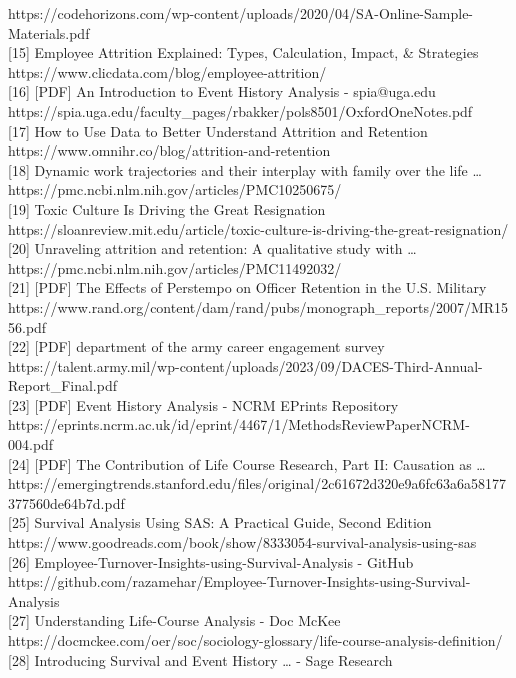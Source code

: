 \documentclass[./main.tex]{subfiles}
\begin{document}
https://codehorizons.com/wp-content/uploads/2020/04/SA-Online-Sample-Materials.pdf\\
{[}15{]} Employee Attrition Explained: Types, Calculation, Impact, \&
Strategies https://www.clicdata.com/blog/employee-attrition/\\
{[}16{]} {[}PDF{]} An Introduction to Event History Analysis -
spia@uga.edu
https://spia.uga.edu/faculty\_pages/rbakker/pols8501/OxfordOneNotes.pdf\\
{[}17{]} How to Use Data to Better Understand Attrition and Retention
https://www.omnihr.co/blog/attrition-and-retention\\
{[}18{]} Dynamic work trajectories and their interplay with family over
the life \ldots{} https://pmc.ncbi.nlm.nih.gov/articles/PMC10250675/\\
{[}19{]} Toxic Culture Is Driving the Great Resignation
https://sloanreview.mit.edu/article/toxic-culture-is-driving-the-great-resignation/\\
{[}20{]} Unraveling attrition and retention: A qualitative study with
\ldots{} https://pmc.ncbi.nlm.nih.gov/articles/PMC11492032/\\
{[}21{]} {[}PDF{]} The Effects of Perstempo on Officer Retention in the
U.S. Military
https://www.rand.org/content/dam/rand/pubs/monograph\_reports/2007/MR1556.pdf\\
{[}22{]} {[}PDF{]} department of the army career engagement survey
https://talent.army.mil/wp-content/uploads/2023/09/DACES-Third-Annual-Report\_Final.pdf\\
{[}23{]} {[}PDF{]} Event History Analysis - NCRM EPrints Repository
https://eprints.ncrm.ac.uk/id/eprint/4467/1/MethodsReviewPaperNCRM-004.pdf\\
{[}24{]} {[}PDF{]} The Contribution of Life Course Research, Part II:
Causation as \ldots{}
https://emergingtrends.stanford.edu/files/original/2c61672d320e9a6fc63a6a58177377560de64b7d.pdf\\
{[}25{]} Survival Analysis Using SAS: A Practical Guide, Second Edition
https://www.goodreads.com/book/show/8333054-survival-analysis-using-sas\\
{[}26{]} Employee-Turnover-Insights-using-Survival-Analysis - GitHub
https://github.com/razamehar/Employee-Turnover-Insights-using-Survival-Analysis\\
{[}27{]} Understanding Life-Course Analysis - Doc McKee
https://docmckee.com/oer/soc/sociology-glossary/life-course-analysis-definition/\\
{[}28{]} Introducing Survival and Event History \ldots{} - Sage Research
\end{document}
